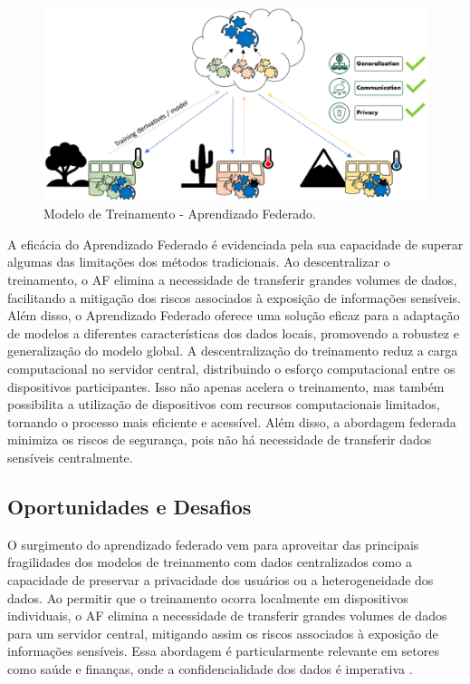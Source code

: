 \begin{figure}[ht]
    \centering
    \includegraphics[scale=0.50]{figuras/FederatedLearning.eps}
    \caption{Modelo de Treinamento - Aprendizado Federado.}
    \label{fig:FederatedLearning}
\end{figure}

A eficácia do Aprendizado Federado é evidenciada pela sua capacidade de superar algumas das limitações dos métodos tradicionais. Ao descentralizar o treinamento, o AF elimina a necessidade de transferir grandes volumes de dados, facilitando a mitigação dos riscos associados à exposição de informações sensíveis. Além disso, o Aprendizado Federado oferece uma solução eficaz para a adaptação de modelos a diferentes características dos dados locais, promovendo a robustez e generalização do modelo global. A descentralização do treinamento reduz a carga computacional no servidor central, distribuindo o esforço computacional entre os dispositivos participantes\cite{yang2019federated}. Isso não apenas acelera o treinamento, mas também possibilita a utilização de dispositivos com recursos computacionais limitados, tornando o processo mais eficiente e acessível. Além disso, a abordagem federada minimiza os riscos de segurança, pois não há necessidade de transferir dados sensíveis centralmente\cite{bonawitz2019towards}.

\subsection{Oportunidades e Desafios}

O surgimento do aprendizado federado vem para aproveitar das principais fragilidades dos modelos de treinamento com dados centralizados como a capacidade de preservar a privacidade dos usuários ou a heterogeneidade dos dados. Ao permitir que o treinamento ocorra localmente em dispositivos individuais, o AF elimina a necessidade de transferir grandes volumes de dados para um servidor central, mitigando assim os riscos associados à exposição de informações sensíveis. Essa abordagem é particularmente relevante em setores como saúde e finanças, onde a confidencialidade dos dados é imperativa \cite{mcmahan2017communication}.

